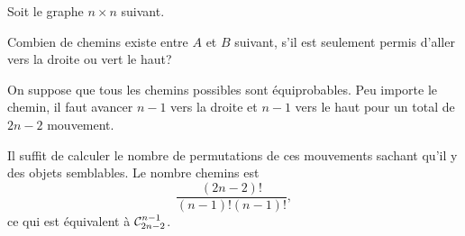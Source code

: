 \documentclass[11pt]{article}
\newcommand\comb[2]{%
	\ensuremath{%
		\mathcal{C}_{#2}^{#1}%
	}%
}%
\theoremstyle{remark}
\theoremstyle{definition}
\begin{document}
\begin{exemple}\label{ex:network}
	Soit le graphe $n\times n$ suivant.
	\begin{figure}[H]
		\vspace{-3mm}
		\centering
		
		\vspace{-3mm}
	\end{figure}

	Combien de chemins existe entre $A$ et $B$ suivant, s'il est seulement
	permis d'aller vers la droite ou vert le haut?
\end{exemple}
\addtocounter{exemple}{-1}
\begin{exemple}[suite]
	On suppose que tous les chemins possibles sont équiprobables. Peu importe
	le chemin, il faut avancer $n-1$ vers la droite et $n-1$ vers le haut pour
	un total de $2n-2$ mouvement.
	
	Il suffit de calculer le nombre de permutations de ces mouvements sachant
	qu'il y des objets semblables. Le nombre chemins est
	\begin{equation*}
		\frac{\left(2n-2\right)!}{\left(n-1\right)!\left(n-1\right)!},
	\end{equation*}
	ce qui est équivalent à $\comb{n-1}{2n-2}$.
\end{exemple}
\end{document}
